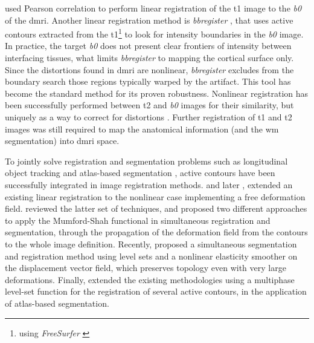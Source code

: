 \cite{saad_new_2009} used Pearson correlation to perform linear registration
  of the \gls*{t1} image to the \emph{b0} of the \gls*{dmri}.
Another linear registration method is \emph{bbregister} \citep{greve_accurate_2009},
  that uses active contours extracted from the \gls*{t1}\footnote{using \emph{FreeSurfer}
  \citep{fischl_freesurfer_2012}} to look for intensity boundaries in the \emph{b0}
  image.
In practice, the target \emph{b0} does not present clear frontiers of intensity between
  interfacing tissues, what limits \emph{bbregister} to mapping the cortical surface only.
Since the distortions found in \gls*{dmri} are nonlinear, \emph{bbregister} excludes
  from the boundary search those regions typically warped by the artifact.
This tool has become the standard method for its proven robustness.
Nonlinear registration has been successfully performed between \gls*{t2} and \emph{b0}
  images for their similarity, but uniquely as a way to correct for distortions
  \citep{kybic_unwarping_2000,studholme_accurate_2000,wu_comparison_2008,tao_variational_2009}.
Further registration of \gls*{t1} and \gls*{t2} images was still required to map the anatomical
  information (and the \gls*{wm} segmentation) into \gls*{dmri} space.

To jointly solve registration and segmentation problems such as longitudinal object
  tracking \citep{paragios_level_2003} and atlas-based segmentation 
  \citep{gorthi_active_2011}, active contours have been successfully integrated 
  in image registration methods.
\cite{unal_coupled_2005} and later \cite{wang_joint_2006},
  extended an existing linear registration \cite{yezzi_variational_2003}
  to the nonlinear case implementing a free deformation field.
\cite{droske_mumfordshah_2009} reviewed the latter set of techniques, and proposed two different
  approaches to apply the Mumford-Shah functional \citep{mumford_optimal_1989} in simultaneous
  registration and segmentation, through the propagation of the deformation field from
  the contours to the whole image definition.
Recently, \cite{guyader_combined_2011} proposed a simultaneous segmentation and
  registration method using level sets and a nonlinear elasticity smoother on the
  displacement vector field, which preserves topology even with very large deformations.
Finally, \cite{gorthi_active_2011} extended the existing methodologies using a multiphase
  level-set function for the registration of several active contours, in the application
  of atlas-based segmentation.
  

